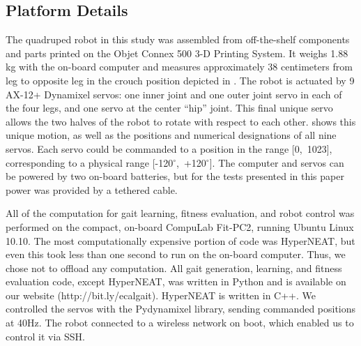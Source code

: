 \subsection{Platform Details}






The quadruped robot in this study was assembled from off-the-shelf components and parts
printed on the Objet Connex 500 3-D Printing System. It weighs 1.88 kg
with the on-board computer and measures approximately 38 centimeters
from leg to opposite leg in the crouch position depicted in
. The robot is actuated by 9 AX-12+
Dynamixel servos: one inner joint and one outer joint servo in each of
the four legs, and one servo at the center ``hip'' joint.  This final
unique servo allows the two halves of the robot to rotate with respect
to each other.  shows this unique motion, as well
as the positions and numerical designations of all nine servos.  Each
servo could be commanded to a position in the range [0,~1023],
corresponding to a physical range [-120$^{\circ}$,~+120$^{\circ}$].
The computer and servos can be powered by two on-board batteries, but
for the tests presented in this paper power was provided by a tethered
cable.

All of the computation for gait learning, fitness evaluation, and
robot control was performed on the compact, on-board CompuLab Fit-PC2,
running Ubuntu Linux 10.10. 
The most computationally expensive portion of code was HyperNEAT, but even
this took less than one second to run on the on-board computer. Thus,
we chose not to offload any computation.
All gait generation, learning, and fitness
evaluation code, except HyperNEAT, was written in Python and is
available on our website (http://bit.ly/ecalgait).  HyperNEAT is written in
C++.  We controlled the servos with the Pydynamixel library, sending commanded positions at 40Hz.  The robot
connected to a wireless network on boot, which enabled us to control
it via SSH.



